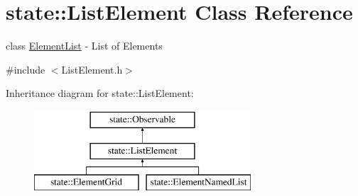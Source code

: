 \hypertarget{classstate_1_1_list_element}{}\section{state\+:\+:List\+Element Class Reference}
\label{classstate_1_1_list_element}


class \hyperlink{classstate_1_1_element_list}{Element\+List} -\/ List of Elements  




{\ttfamily \#include $<$List\+Element.\+h$>$}

Inheritance diagram for state\+:\+:List\+Element\+:\begin{figure}[H]
\begin{center}
\leavevmode
\includegraphics[height=3.000000cm]{classstate_1_1_list_element}
\end{center}
\end{figure}

